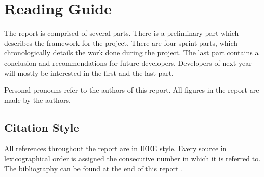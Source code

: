 \chapter*{Reading Guide}
The report is comprised of several parts. There is a preliminary part which describes the framework for the project. There are four sprint parts, which chronologically details the work done during the project. The last part contains a conclusion and recommendations for future developers. Developers of next year will mostly be interested in the first and the last part.

Personal pronouns refer to the authors of this report. All figures in the report are made by the authors.

\section*{Citation Style}
All references throughout the report are in IEEE style. Every source in lexicographical order is assigned the consecutive number in which it is referred to. The bibliography can be found at the end of this report .